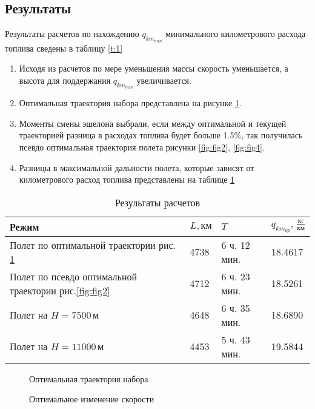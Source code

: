 \subsection{Результаты}
Результаты расчетов по нахождению $q_{{km}_{min}}$ минимального километрового расхода топлива сведены в таблицу \ref{t:1}
\begin{enumerate}
\item Исходя из расчетов по мере уменьшения массы скорость уменьшается, а высота для поддержания $q_{{km}_{min}}$ увеличивается.
\item Оптимальная траектория набора представлена на рисунке \ref{fig:fig1}.
\item Моменты смены эшелона выбрали, если между оптимальной и текущей траекторией разница в расходах топлива будет больше 1.5\%, так получилась псевдо оптимальная траектория полета рисунки \ref{fig:fig2}, \ref{fig:fig4}.
\item Разницы в максимальной дальности полета, которые зависят от километрового расход топлива представлены на таблице \ref{tab:tab:opt_vs_const_h} 
\end{enumerate}

\begin{table}[H]
\centering
\begin{tabular}{|l|l|l|l|}
\hline
Режим & $L, км$ & $T$ & $q_{km_{ср}}, \, \frac{кг}{км}$\\
\hline
Полет по оптимальной траектории рис. \ref{fig:fig1}& 4738 & 6 ч. 12 мин. & 18.4617\\
\hline
Полет по псевдо оптимальной траектории рис.\ref{fig:fig2}& 4712 & 6 ч. 23 мин. & 18.5261\\
\hline
Полет на $H=7500\,м$ & 4648 & 6 ч. 35 мин.& 18.6890\\
\hline
Полет на $H=11000\,м$ & 4453 & 5 ч. 43 мин. & 19.5844\\
\hline
\end{tabular}
\caption{Результаты расчетов}
\label{tab:tab:opt_vs_const_h}
\end{table}


\begin{figure}[H]
\centering
\scalebox{0.8}{}
\caption{Оптимальная траектория набора}
\label{fig:fig1}
\end{figure}
\begin{figure}[H]
\centering
\scalebox{0.8}{}
\caption{Оптимальное изменение скорости}
\label{fig:fig3}
\end{figure}

